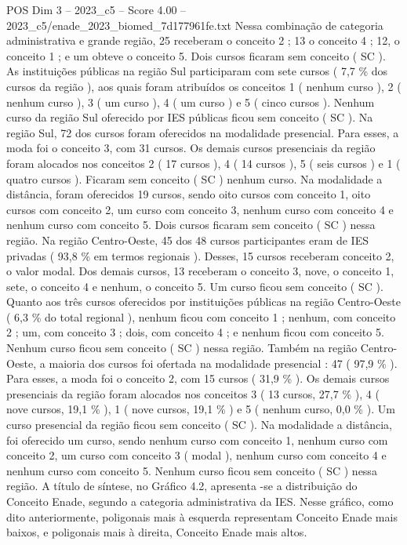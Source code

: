 \begin{textsample}{POS Dim 3 – 2023\_c5 – Score 4.00 – 2023\_c5/enade\_2023\_biomed\_7d177961fe.txt}
Nessa combinação de categoria administrativa e grande região, 25 receberam o conceito 2 ; 13 o conceito 4 ; 12, o conceito 1 ; e um obteve o conceito 5.
Dois cursos ficaram sem conceito ( SC ).
As instituições públicas na região Sul participaram com sete cursos ( 7,7 \% dos cursos da região ), aos quais foram atribuídos os conceitos 1 ( nenhum curso ), 2 ( nenhum curso ), 3 ( um curso ), 4 ( um curso ) e 5 ( cinco cursos ).
Nenhum curso da região Sul oferecido por IES públicas ficou sem conceito ( SC ).
Na região Sul, 72 dos cursos foram oferecidos na modalidade presencial.
Para esses, a moda foi o conceito 3, com 31 cursos.
Os demais cursos presenciais da região foram alocados nos conceitos 2 ( 17 cursos ), 4 ( 14 cursos ), 5 ( seis cursos ) e 1 ( quatro cursos ).
Ficaram sem conceito ( SC ) nenhum curso.
Na modalidade a distância, foram oferecidos 19 cursos, sendo oito cursos com conceito 1, oito cursos com conceito 2, um curso com conceito 3, nenhum curso com conceito 4 e nenhum curso com conceito 5.
Dois cursos ficaram sem conceito ( SC ) nessa região.
Na região Centro-Oeste, 45 dos 48 cursos participantes eram de IES privadas ( 93,8 \% em termos regionais ).
Desses, 15 cursos receberam conceito 2, o valor modal.
Dos demais cursos, 13 receberam o conceito 3, nove, o conceito 1, sete, o conceito 4 e nenhum, o conceito 5.
Um curso ficou sem conceito ( SC ).
Quanto aos três cursos oferecidos por instituições públicas na região Centro-Oeste ( 6,3 \% do total regional ), nenhum ficou com conceito 1 ; nenhum, com conceito 2 ; um, com conceito 3 ; dois, com conceito 4 ; e nenhum ficou com conceito 5.
Nenhum curso ficou sem conceito ( SC ) nessa região.
Também na região Centro-Oeste, a maioria dos cursos foi ofertada na modalidade presencial : 47 ( 97,9 \% ).
Para esses, a moda foi o conceito 2, com 15 cursos ( 31,9 \% ).
Os demais cursos presenciais da região foram alocados nos conceitos 3 ( 13 cursos, 27,7 \% ), 4 ( nove cursos, 19,1 \% ), 1 ( nove cursos, 19,1 \% ) e 5 ( nenhum curso, 0,0 \% ).
Um curso presencial da região ficou sem conceito ( SC ).
Na modalidade a distância, foi oferecido um curso, sendo nenhum curso com conceito 1, nenhum curso com conceito 2, um curso com conceito 3 ( modal ), nenhum curso com conceito 4 e nenhum curso com conceito 5.
Nenhum curso ficou sem conceito ( SC ) nessa região.
A título de síntese, no Gráfico 4.2, apresenta -se a distribuição do Conceito Enade, segundo a categoria administrativa da IES.
Nesse gráfico, como dito anteriormente, poligonais mais à esquerda representam Conceito Enade mais baixos, e poligonais mais à direita, Conceito Enade mais altos.

\end{textsample}
